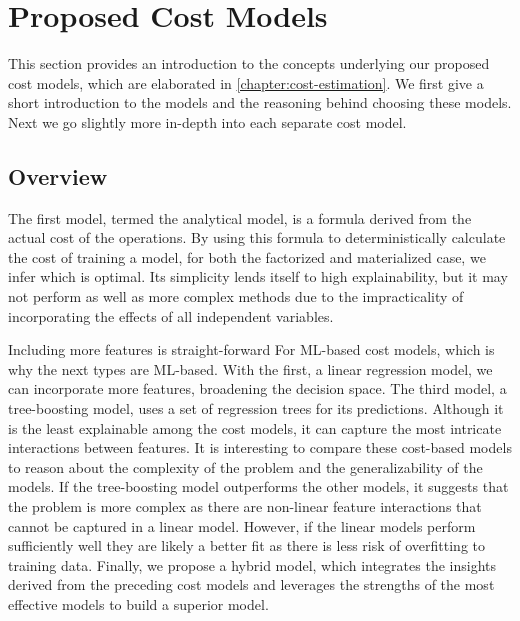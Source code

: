 \section{Proposed Cost Models}
\label{sec:4-cost-estimation}
This section provides an introduction to the concepts underlying our proposed cost models, which are elaborated in \autoref{chapter:cost-estimation}. We first give a short introduction to the models and the reasoning behind choosing these models. Next we go slightly more in-depth into each separate cost model.

\subsection{Overview}
The first model, termed the analytical model, is a formula derived from the actual cost of the operations. By using this formula to deterministically calculate the cost of training a model, for both the factorized and materialized case, we infer which is optimal. Its simplicity lends itself to high explainability, but it may not perform as well as more complex methods due to the impracticality of incorporating the effects of all independent variables.

Including more features is straight-forward For ML-based cost models, which is why the next types are ML-based. With the first, a linear regression model, we can incorporate more features, broadening the decision space. The third model, a tree-boosting model, uses a set of regression trees for its predictions. Although it is the least explainable among the cost models, it can capture the most intricate interactions between features. It is interesting to compare these cost-based models to reason about the complexity of the problem and the generalizability of the models. If the tree-boosting model outperforms the other models, it suggests that the problem is more complex as there are non-linear feature interactions that cannot be captured in a linear model. However, if the linear models perform sufficiently well they are likely a better fit as there is less risk of overfitting to training data. Finally, we propose a hybrid model, which integrates the insights derived from the preceding cost models and leverages the strengths of the most effective models to build a superior model.


